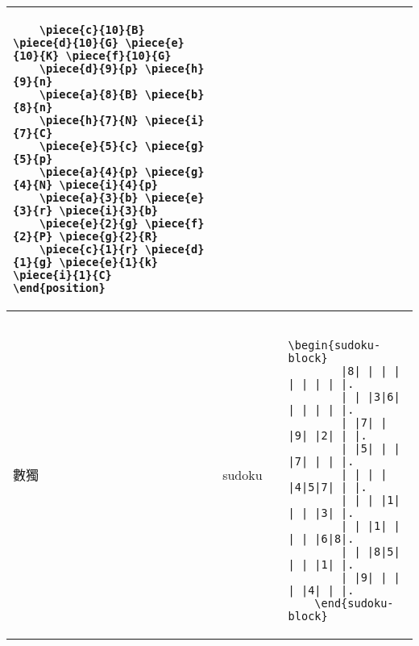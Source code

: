 \documentclass{../indiv}
\begin{document}
{\begin{table}[H]
\begin{tabular}{Z}
\begin{tabmp}[-0.2]
\begin{verbatim}
	\piece{c}{10}{B} \piece{d}{10}{G} \piece{e}{10}{K} \piece{f}{10}{G}
	\piece{d}{9}{p} \piece{h}{9}{n}
	\piece{a}{8}{B} \piece{b}{8}{n}
	\piece{h}{7}{N} \piece{i}{7}{C}
	\piece{e}{5}{c} \piece{g}{5}{p}
	\piece{a}{4}{p} \piece{g}{4}{N} \piece{i}{4}{p}
	\piece{a}{3}{b} \piece{e}{3}{r} \piece{i}{3}{b}
	\piece{e}{2}{g} \piece{f}{2}{P} \piece{g}{2}{R}
	\piece{c}{1}{r} \piece{d}{1}{g} \piece{e}{1}{k} \piece{i}{1}{C}
\end{position}
					\end{verbatim}
				\end{tabmp} \\ \hline
				數獨 & sudoku &
				\begin{tabmp}
					\centering
				\end{tabmp} &
				\begin{tabmp}[-0.2]
					\begin{verbatim}
	\begin{sudoku-block}
		|8| | | | | | | | |.
		| | |3|6| | | | | |.
		| |7| | |9| |2| | |.
		| |5| | | |7| | | |.
		| | | | |4|5|7| | |.
		| | | |1| | | |3| |.
		| | |1| | | | |6|8|.
		| | |8|5| | | |1| |.
		| |9| | | | |4| | |.
	\end{sudoku-block}
					\end{verbatim}
				\end{tabmp} \\ \hline
			\end{tabular}
		\end{table}
		\pagebreak
		\begin{table}[H]
			\ContinuedFloat
			\centering
			

\end{table}}
\end{document}
